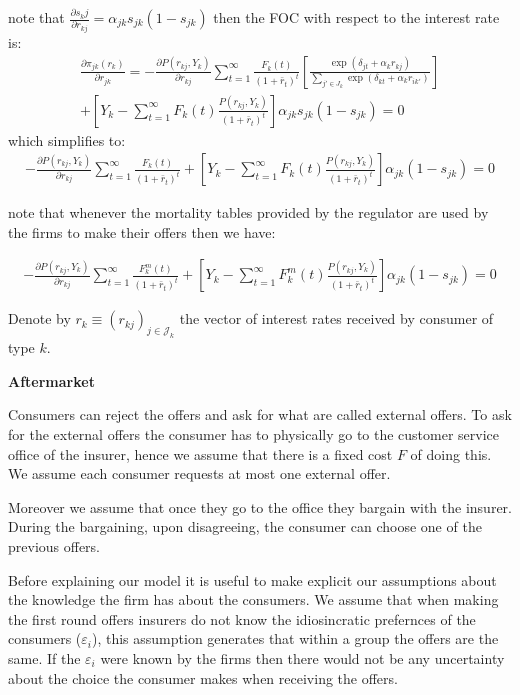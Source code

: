 \documentclass[12pt]{article}
\theoremstyle{plain}
\theoremstyle{plain}
\begin{document}
note that $\frac{\partial s_kj}{\partial r_{kj}} = \alpha_{jk}s_{jk}(1-s_{jk})$ then the FOC with respect to the interest rate is: 
\begin{align*}
    \frac{\partial \pi_{jk}( r_k)}{\partial r_{jk}} = - \frac{\partial P(r_{kj},Y_k)}{\partial r_{kj}}  \sum_{t=1}^{\infty}  \frac{F_k(t)}{(1+\bar{r}_t)^t}  \left[\frac{\exp(\delta_{jt} + \alpha_{k}r_{kj})}{\sum_{j'\in J_k}\exp(\delta_{kt} + \alpha_kr_{ik'})}\right] \\
    + \left[Y_k -   \sum_{t=1}^{\infty} F_k(t) \frac{P(r_{kj},Y_k)}{(1+\bar{r}_t)^t} \right] 
    \alpha_{jk}s_{jk}(1-s_{jk}) =0
\end{align*}
which simplifies to: 
\begin{align*}
    - \frac{\partial P(r_{kj},Y_k)}{\partial r_{kj}}  \sum_{t=1}^{\infty}  \frac{F_k(t)}{(1+\bar{r}_t)^t}  
    + \left[Y_k -   \sum_{t=1}^{\infty} F_k(t) \frac{P(r_{kj},Y_k)}{(1+\bar{r}_t)^t} \right] 
    \alpha_{jk}(1-s_{jk}) =0
\end{align*}

note that whenever the mortality tables provided by the regulator are used by the firms to make their offers then we have: 

\begin{align}\label{eq:FOC_simplified}
    - \frac{\partial P(r_{kj},Y_k)}{\partial r_{kj}}  \sum_{t=1}^{\infty}  \frac{F_k^m(t)}{(1+\bar{r}_t)^t}  
    + \left[Y_k -   \sum_{t=1}^{\infty} F_k^m(t) \frac{P(r_{kj},Y_k)}{(1+\bar{r}_t)^t} \right] 
    \alpha_{jk}(1-s_{jk}) =0
\end{align}

Denote by $r_k \equiv (r_{kj})_{j\in \mathcal{J}_k}$ the vector of interest rates received by consumer of type $k$. \

\textbf{Aftermarket}

Consumers can reject the offers and ask for what are called external offers. To ask for the external offers the consumer has to physically go to the customer service office of the insurer, hence we assume that there is a fixed cost $F$ of doing this. We assume each consumer requests at most one external offer. 

Moreover we assume that once they go to the office they bargain with the insurer. During the bargaining, upon disagreeing, the consumer can choose one of the previous offers.  

Before explaining our model it is useful to make explicit our assumptions about the knowledge the firm has about the consumers. We assume that when making the first round offers insurers do not know the idiosincratic prefernces of the consumers ($\varepsilon_i$), this assumption generates that within a group the offers are the same. If the $\varepsilon_i$ were known by the firms then there would not be any uncertainty about the choice the consumer makes when receiving the offers. 
\end{document}
